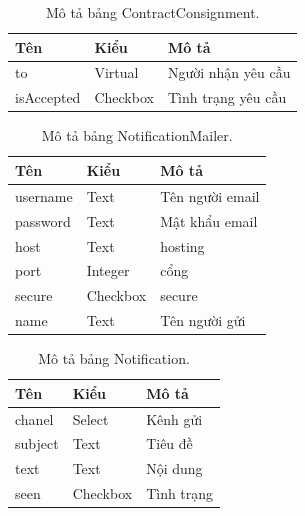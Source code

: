 \documentclass[11pt]{report}
\begin{document}
\clearpage
\FloatBarrier
	\begin{table}[h!]
		\begin{center}
			\caption{Mô tả bảng ContractConsignment.}
			\label{table:ContractConsignment}
			\begin{tabularx}{0.6\textwidth}{ |l|l|X| } 
				\hline
				Tên & Kiểu & Mô tả \\
				\hline
				to & Virtual & Người nhận yêu cầu \\
				isAccepted & Checkbox & Tình trạng yêu cầu \\
				\hline
			\end{tabularx}
		\end{center}
	\end{table}
	
	\begin{table}[h!]
		\begin{center}
			\caption{Mô tả bảng NotificationMailer.}
			\begin{tabularx}{0.6\textwidth}{ |l|l|X| } 
				\hline
				Tên & Kiểu & Mô tả \\
				\hline
				username & Text & Tên người email \\
				password & Text & Mật khẩu email \\
				host & Text & hosting \\
				port & Integer & cổng \\
				secure & Checkbox & secure \\
				name & Text & Tên người gửi \\ 
				\hline
			\end{tabularx}
			\label{table:NotificationMailer}
		\end{center}
	\end{table}
	
	
	\begin{table}[h!]
		\begin{center}
			\caption{Mô tả bảng Notification.}
			\begin{tabularx}{0.6\textwidth}{ |l|l|X| } 
				\hline
				Tên & Kiểu & Mô tả \\
				\hline
				chanel & Select & Kênh gửi \\
				subject & Text & Tiêu đề \\
				text & Text & Nội dung \\
				seen & Checkbox & Tình trạng \\ 
				\hline
			\end{tabularx}
			\label{table:Notification}
		\end{center}
	\end{table}
	
\end{document}
